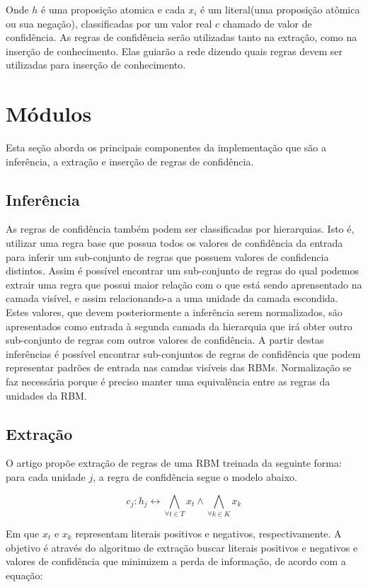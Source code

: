 \documentclass[a4paper, 12pt]{article}
\begin{document}
Onde $h$ é uma proposição atomica e cada $x_i$ é um literal(uma proposição atômica ou sua negação), classificadas por um valor real $c$ chamado de valor de confidência. As regras de confidência serão utilizadas tanto na extração, como na inserção de conhecimento. Elas guiarão a rede dizendo quais regras devem ser utilizadas para inserção de conhecimento.
	
\section{Módulos}

Esta seção aborda os principais componentes da implementação que são a inferência, a extração e inserção de regras de confidência.
\subsection{Inferência}
As regras de confidência também podem ser classificadas por hierarquias\cite{Tran}. Isto é, utilizar uma regra base que possua todos os valores de confidência da entrada para inferir um sub-conjunto de regras que possuem valores de confidencia distintos. Assim é possível encontrar um sub-conjunto de regras do qual podemos extrair uma regra que possui maior relação com o que está sendo aprensentado na camada visível, e assim relacionando-a a uma unidade da camada escondida. Estes valores, que devem posteriormente a inferência serem normalizados, são apresentados como entrada à segunda camada da hierarquia que irá obter outro sub-conjunto de regras com outros valores de confidência. A partir destas inferências é possível encontrar sub-conjuntos de regras de confidência que podem representar padrões de entrada nas camdas visíveis das RBMs. Normalização se faz necessária porque é preciso manter uma equivalência entre as regras da unidades da RBM.
\subsection{Extração}
O artigo\cite{Tran} propõe extração de regras de uma RBM treinada da seguinte forma: para cada unidade $j$, a regra de confidência segue o modelo abaixo.

\begin{equation}
	c_j : h_j \leftrightarrow \bigwedge_{\forall t \in T} x_t \wedge \bigwedge_{\forall k \in K} x_k
\end{equation}

Em que $x_t$ e $x_k$ representam literais positivos e negativos, respectivamente. A objetivo é através do algoritmo de extração buscar literais positivos e negativos e valores de confidência que minimizem a perda de informação, de acordo com a equação:
\end{document}
